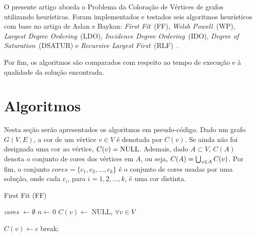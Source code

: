 \documentclass[10pt, twocolumn]{article}
\begin{document}
O presente artigo aborda o Problema da Coloração de Vértices de grafos utilizando
heurísticas.
Foram implementados e testados seis algoritmos heurísticos com base no artigo de
Aslan e Baykan: \emph{First Fit}~(FF), \emph{Welsh Powell}~(WP),
\emph{Largest Degree Ordering}~(LDO), \emph{Incidence Degree Ordering}~(IDO),
\emph{Degree of Saturation}~(DSATUR) e \emph{Recursive Largest First}~(RLF)~\cite{AsBa18}.

Por fim, os algoritmos são comparados com respeito ao tempo de execução e à
qualidade da solução encontrada.


\section{Algoritmos}

Nesta seção serão apresentados os algoritmos em pseudo-código.
Dado um grafo $G(V,E)$, a cor de um vértice $v \in V$ é denotada por $C(v)$.
Se ainda não foi designada uma cor ao vértice, $C(v) = \textnormal{NULL}$.
Ademais, dado $A \subset V$, $C(A)$ denota o conjunto de cores dos vértices em $A$,
ou seja, $C(A)\nobreak=\nobreak\bigcup_{v \in A} C(v)$. Por fim, o conjunto
$cores = \{c_1, c_2, \dots, c_k\}$ é o conjunto de cores usadas por uma solução,
onde cada $c_i$, para $i = 1, 2, \dots, k$, é uma cor distinta.


\begin{algorithm}
\caption{First Fit (FF)}
\label{alg:ff}


\emph{cores} $\gets \emptyset$\;
$n \gets 0$\;
$C(v) \gets$ NULL, $\forall v \in V$\;

 {
     {
         {
            $C(v) \gets c$\;
            break;
        }
    }
}
\;

\end{algorithm}


\end{document}
